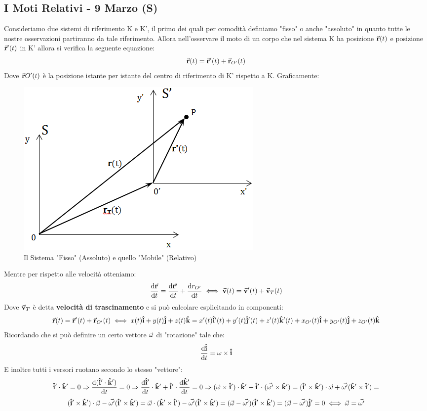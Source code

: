 \documentclass{article}
\newcommand{\then}{\ensuremath{\Rightarrow}}
\renewcommand{\i}{\vu{i}}
\renewcommand{\j}{\vu{j}}
\renewcommand{\k}{\vu{k}}
\renewcommand{\v}{\va{v}}
\renewcommand{\r}{\va{r}}
\begin{document}
\subsection{I Moti Relativi - 9 Marzo (S)}
Consideriamo due sistemi di riferimento K e K', il primo dei quali per comodità definiamo "fisso" o anche "assoluto" in quanto tutte le nostre osservazioni partiranno da tale riferimento. Allora nell'osservare il moto di un corpo che nel sistema K ha posizione $\r(t)$ e posizione $\r'(t)$ in K' allora si verifica la seguente equazione:
\[\r(t)=\r'(t)+\r_{O'}(t)\]
Dove $\r{O'}(t)$ è la posizione istante per istante del centro di riferimento di K' rispetto a K. Graficamente:
\begin{figure}[H]
    \centering
    \includegraphics{Appunti/image20.png}
    \caption{Il Sistema "Fisso" (Assoluto) e quello "Mobile" (Relativo)}
    \label{motirelativi}
\end{figure}
Mentre per rispetto alle velocità otteniamo:
\[\dv{\r}{t}=\dv{\r'}{t}+\dv{r_{O'}}{t}\iff \v(t)=\v'(t)+\v_T(t)\]
Dove $\v_T$ è detta \textbf{velocità di trascinamento} e si può calcolare esplicitando in componenti:
\[\r(t)=\r'(t)+\r_{O'}(t)\iff x(t)\i+y(t)\j+z(t)\k=x'(t)\i'(t)+y'(t)\j'(t)+z'(t)\k'(t)+x_{O'}(t)\i+y_{O'}(t)\j+z_{O'}(t)\k\]
Ricordando che si può definire un certo vettore $\va{\omega}$ di "rotazione" tale che:
\[\dv{\i}{t}=\omega\times\i\]
E inoltre tutti i versori ruotano secondo lo stesso "vettore":
\[\i'\cdot\k'=0\then \dv{(\i'\cdot\k')}{t}=0\then \dv{\i'}{t}\cdot\k'+\i'\cdot\dv{\k'}{t}=0\then (\va{\omega}\times\i')\cdot\k'+\i'\cdot(\va{\omega'}\times\k')=(\i'\times\k')\cdot\va{\omega}+\va{\omega'}(\k'\times\i')=\]\[(\i'\times\k')\cdot\va{\omega}-\va{\omega'}(\i'\times\k')=\va{\omega}\cdot(\k'\times\i')-\va{\omega'}(\i'\times\k')=(\va{\omega}-\va{\omega'})(\i'\times\k')=(\va{\omega}-\va{\omega'})\j'=0\iff \va{\omega}=\va{\omega'}\]
\end{document}

